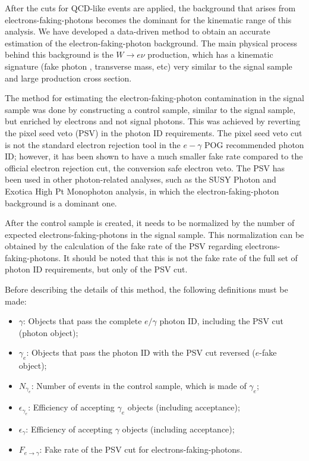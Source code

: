
After the cuts for QCD-like events are applied, the background that arises from electrons-faking-photons becomes the dominant for the kinematic range of this analysis. We have developed a data-driven method to obtain an accurate estimation of the electron-faking-photon background.
The main physical process behind this background is the $W\rightarrow e \nu$ production, which has a kinematic signature (fake photon \et, transverse mass, etc) very similar to the signal sample and large production cross section.

The method for estimating the electron-faking-photon contamination in the signal sample was done by constructing a control sample, similar to the signal sample, but enriched by electrons and not signal photons. This was achieved by reverting the pixel seed veto (PSV) in the photon ID requirements. The pixel seed veto cut is not the standard electron rejection tool in the $e-\gamma$ POG recommended photon ID; however, it has been shown to have a much smaller fake rate compared to the official electron rejection cut, the conversion safe electron veto. The PSV has been used in other photon-related analyses, such as the SUSY Photon and Exotica High Pt Monophoton analysis, in which the electron-faking-photon background is a dominant one.

After the control sample is created, it needs to be normalized by the number of expected electrons-faking-photons in the signal sample. This normalization can be obtained by the calculation of the fake rate of the PSV regarding electrons-faking-photons. It should be noted that this is not the fake rate of the full set of photon ID requirements, but only of the PSV cut. 

Before describing the details of this method, the following definitions must be made:

\begin{itemize}
\item $\gamma$: Objects that pass the complete $e/\gamma$ photon ID, including the PSV cut (photon object);
\item $\gamma_e$: Objects that pass the photon ID with the PSV cut reversed ($e$-fake object);
\item $N_{\gamma_e}$: Number of events in the control sample, which is made of $\gamma_e$;
\item $\epsilon_{\gamma_e}$: Efficiency of accepting $\gamma_e$ objects (including acceptance);
\item $\epsilon_{\gamma}$: Efficiency of accepting $\gamma$ objects (including acceptance);
\item $F_{e\rightarrow\gamma}$: Fake rate of the PSV cut for electrons-faking-photons.
\end{itemize}


